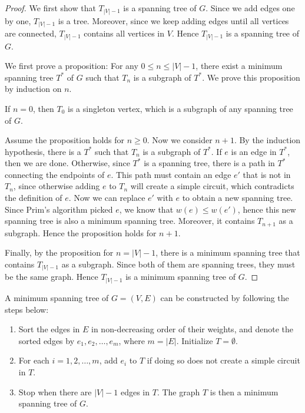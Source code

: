 \begin{proof}
    We first show that $T_{|V|-1}$ is a spanning tree of $G$. Since we add edges one by one, $T_{|V|-1}$ is a tree. Moreover, since we keep adding edges until all vertices are connected, $T_{|V|-1}$ contains all vertices in $V$. Hence $T_{|V|-1}$ is a spanning tree of $G$.

    We first prove a proposition: For any $0\leq n\leq |V|-1$, there exist a minimum spanning tree $T^*$ of $G$ such that $T_n$ is a subgraph of $T^*$. We prove this proposition by induction on $n$.

    If $n=0$, then $T_0$ is a singleton vertex, which is a subgraph of any spanning tree of $G$.

    Assume the proposition holds for $n\geq 0$. Now we consider $n+1$. By the induction hypothesis, there is a $T^*$ such that $T_n$ is a subgraph of $T^*$. If $e$ is an edge in $T^*$, then we are done. 
    Otherwise, since $T^*$ is a spanning tree, there is a path in $T^*$ connecting the endpoints of $e$. This path must contain an edge $e'$ that is not in $T_n$, since otherwise adding $e$ to $T_n$ will create a simple circuit, which contradicts the definition of $e$. Now we can replace $e'$ with $e$ to obtain a new spanning tree. Since Prim's algorithm picked $e$, we know that $w(e)\leq w(e')$, hence this new spanning tree is also a minimum spanning tree. Moreover, it contains $T_{n+1}$ as a subgraph. Hence the proposition holds for $n+1$.

    Finally, by the proposition for $n=|V|-1$, there is a minimum spanning tree that contains $T_{|V|-1}$ as a subgraph. Since both of them are spanning trees, they must be the same graph. Hence $T_{|V|-1}$ is a minimum spanning tree of $G$.
\end{proof}

\begin{algo}
    A minimum spanning tree of $G=(V,E)$ can be constructed by following the steps below:
    \begin{enumerate}[itemindent=0ex, itemsep=0pt, label=\upshape{(\alph*)}]
        \item Sort the edges in $E$ in non-decreasing order of their weights, and denote the sorted edges by $e_1,e_2,\dots,e_{m}$, where $m=|E|$. Initialize $T=\emptyset$.
        \item For each $i=1,2,\dots,m$, add $e_i$ to $T$ if doing so does not create a simple circuit in $T$.
        \item Stop when there are $|V|-1$ edges in $T$. The graph $T$ is then a minimum spanning tree of $G$.
    \end{enumerate}
\end{algo}

